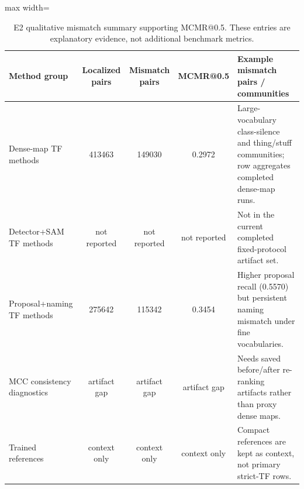 \documentclass[11pt,a4paper]{article}
\begin{document}
\begin{table}[H]
\centering
\scriptsize
\caption{E2 qualitative mismatch summary supporting MCMR@0.5. These entries are explanatory evidence, not additional benchmark metrics.}
\label{tab:appendix-ambiguity-graph}
\begin{adjustbox}{max width=\textwidth}
\begin{tabular}{l c c c p{}}
\toprule
Method group & Localized pairs & Mismatch pairs & MCMR@0.5 & Example mismatch pairs / communities \\
\midrule
Dense-map TF methods & 413463 & 149030 & 0.2972 & Large-vocabulary class-silence and thing/stuff communities; row aggregates completed dense-map runs. \\
Detector+SAM TF methods & not reported & not reported & not reported & Not in the current completed fixed-protocol artifact set. \\
Proposal+naming TF methods & 275642 & 115342 & 0.3454 & Higher proposal recall (0.5570) but persistent naming mismatch under fine vocabularies. \\
MCC consistency diagnostics & artifact gap & artifact gap & artifact gap & Needs saved before/after re-ranking artifacts rather than proxy dense maps. \\
Trained references & context only & context only & context only & Compact references are kept as context, not primary strict-TF rows. \\
\bottomrule
\end{tabular}
\end{adjustbox}
\end{table}
\end{document}
